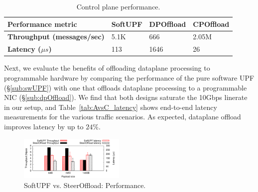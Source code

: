\begin{table}[t]
\begin{scriptsize}
\begin{center}
\def\arraystretch{1.5}%
\begin{tabular}{|p{3cm}|p{1.1cm}|p{1.2cm}|p{1.2cm}|}\hline 
{\bf{Performance metric}} & {\bf{SoftUPF}} & {\bf{DPOffload}} & {\bf{CPOffload}} \\ \hline 
{\bf{Throughput (messages/sec)}} & 5.1K  & 666  & 2.05M  \\ \hline
{\bf{Latency ($\mu s$)}} & 113  & 1646  & 26 \\ \hline
\end{tabular}
\setlength{\abovecaptionskip}{-8pt}
\setlength{\belowcaptionskip}{8pt}
\caption{Control plane performance.} 
\vspace{-2mm}
\label{tab:perf-cp-offload}
\end{center}
\end{scriptsize}
\end{table}
 Next, we evaluate the benefits of offloading dataplane processing to programmable hardware by comparing the performance of the pure software UPF (\S\ref{sub:swUPF}) with one that offloads dataplane processing to a programmable NIC (\S\ref{sub:dpOffload}). We find that both designs saturate the 10Gbps linerate in our setup, and Table~\ref{tab:AvsC_latency} shows end-to-end latency measurements for the various traffic scenarios. As expected, dataplane offload improves latency by up to $24$\%.
\begin{figure}[t]
 \centering
\includegraphics[width=0.45\textwidth]{graphs/pipelineVsRTT}
 \setlength{\abovecaptionskip}{4pt}
 \setlength{\belowcaptionskip}{-12pt}
 \caption{SoftUPF vs. SteerOffload: Performance.}
 \label{fig:AvsB_tput}
\end{figure}

